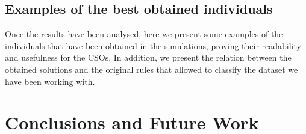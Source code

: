 \documentclass[a4paper,10pt,twocolumn,preprint,3p]{elsarticle}
\begin{document}
\subsection{Examples of the best obtained individuals}
\label{subsec:examples}

Once the results have been analysed, here we present some examples of the individuals that have been obtained in the simulations, proving their readability and usefulness for the CSOs. In addition, we present the relation between the obtained solutions and the original rules that allowed to classify the dataset we have been working with.


%
%
%


\section{Conclusions and Future Work}
\label{sec:future}
\end{document}

